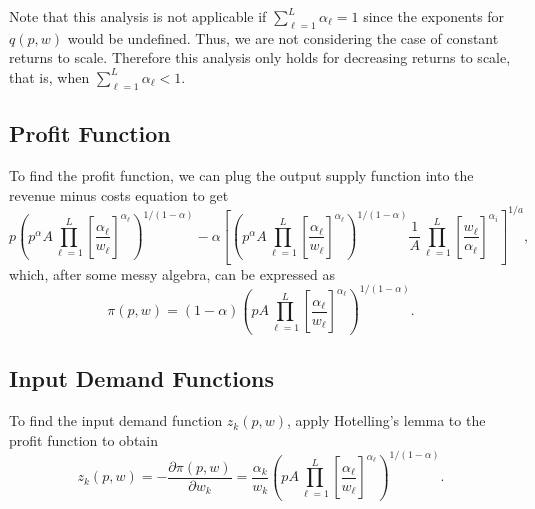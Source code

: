 \documentclass[12pt]{article}
\theoremstyle{definition}
\begin{document}
Note that this analysis is not applicable if $\sum_{{\ell}=1}^L \alpha_{\ell} = 1$ since the exponents for $q(p,w)$ would be undefined. Thus, we are not considering the case of constant returns to scale. Therefore this analysis only holds for decreasing returns to scale, that is, when $\sum_{{\ell}=1}^L \alpha_{\ell} < 1$. 



\subsection{Profit Function} 
	To find the profit function, we can plug the output supply function into the revenue minus costs equation to get
\[
	 p \left ( p^{\alpha} A \prod_{{\ell}=1}^L \left[\frac{\alpha_{\ell}}{w_{\ell}} \right ] ^{\alpha_{\ell}}  \right)^{1 / (1 - \alpha)}	 -  \alpha \left[ \left ( p^{\alpha} A \prod_{{\ell}=1}^L \left[\frac{\alpha_{\ell}}{w_{\ell}} \right ] ^{\alpha_{\ell}}  \right)^{1 / (1 - \alpha)} \frac{1}{A} \prod_{{\ell}=1}^L \left[\frac{w_{\ell}}{\alpha_{\ell}} \right ] ^{\alpha_i} \right]^{1 / a},
     	\]
which, after some messy algebra, can be expressed as
\[
	\pi(p,w)=\left( 1	 -  \alpha  \right) \left (p A \prod_{{\ell}=1}^L \left[\frac{\alpha_{\ell}}{w_{\ell}} \right ] ^{\alpha_{\ell}}  \right)^{1 / (1 - \alpha)}.
\]




\subsection{Input Demand Functions}
To find the input demand function $z_k(p,w)$, apply Hotelling's lemma to the profit function to obtain
	\[z_k(p,w)=-\frac{\partial \pi(p,w)}{\partial w_k} = \frac{\alpha_k}{w_k} \left (p A \prod_{{\ell}=1}^L \left[\frac{\alpha_{\ell}}{w_{\ell}} \right ] ^{\alpha_{\ell}}  \right)^{1 / (1 - \alpha)}.	\]  
\end{document}
